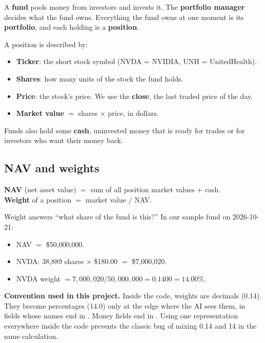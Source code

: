 \documentclass[11pt]{article}
\newcommand{\code}[1]{\texttt{\detokenize{#1}}}
\begin{document}
A \textbf{fund} pools money from investors and invests it. The \textbf{portfolio manager}
decides what the fund owns. Everything the fund owns at one moment is its
\textbf{portfolio}, and each holding is a \textbf{position}.

A position is described by:
\begin{itemize}
  \item \textbf{Ticker}: the short stock symbol (NVDA = NVIDIA, UNH = UnitedHealth).
  \item \textbf{Shares}: how many units of the stock the fund holds.
  \item \textbf{Price}: the stock's price. We use the \textbf{close}, the last traded price
        of the day.
  \item \textbf{Market value} $=$ shares $\times$ price, in dollars.
\end{itemize}

Funds also hold some \textbf{cash}, uninvested money that is ready for trades or for
investors who want their money back.

\subsection{NAV and weights}

\begin{keyidea}[Definitions]
\textbf{NAV} (net asset value) $=$ sum of all position market values $+$ cash.\\
\textbf{Weight} of a position $=$ market value $/$ NAV.
\end{keyidea}

Weight answers ``what share of the fund is this?'' In our sample fund on 2026-10-21:

\begin{itemize}
  \item NAV $=$ \$50{,}000{,}000.
  \item NVDA: 38{,}889 shares $\times$ \$180.00 $=$ \$7{,}000{,}020.
  \item NVDA weight $= 7{,}000{,}020 / 50{,}000{,}000 = 0.1400 = 14.00\%$.
\end{itemize}

\textbf{Convention used in this project.} Inside the code, weights are decimals (0.14).
They become percentages (14.0) only at the edge where the AI sees them, in fields whose names
end in \code{_pct}. Money fields end in \code{_usd}. Using one representation everywhere
inside the code prevents the classic bug of mixing 0.14 and 14 in the same calculation.
\end{document}

